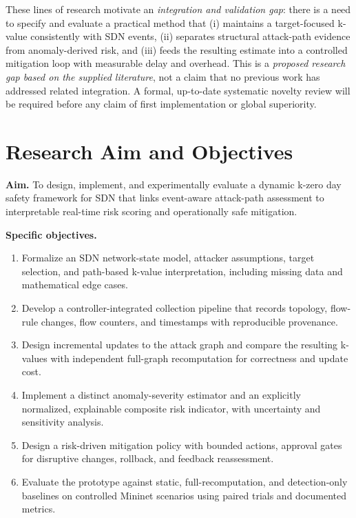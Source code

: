 \documentclass[12pt,a4paper,oneside]{article}
\begin{document}
These lines of research motivate an \emph{integration and validation gap}: there is a need to specify and evaluate a practical method that (i) maintains a target-focused k-value consistently with SDN events, (ii) separates structural attack-path evidence from anomaly-derived risk, and (iii) feeds the resulting estimate into a controlled mitigation loop with measurable delay and overhead. This is a \emph{proposed research gap based on the supplied literature}, not a claim that no previous work has addressed related integration. A formal, up-to-date systematic novelty review will be required before any claim of first implementation or global superiority.

\section{Research Aim and Objectives}\label{sec:objectives}
\textbf{Aim.} To design, implement, and experimentally evaluate a dynamic k-zero day safety framework for SDN that links event-aware attack-path assessment to interpretable real-time risk scoring and operationally safe mitigation.

\textbf{Specific objectives.}
\begin{enumerate}[label=\textbf{O\arabic*.}]
\item Formalize an SDN network-state model, attacker assumptions, target selection, and path-based k-value interpretation, including missing data and mathematical edge cases.
\item Develop a controller-integrated collection pipeline that records topology, flow-rule changes, flow counters, and timestamps with reproducible provenance.
\item Design incremental updates to the attack graph and compare the resulting k-values with independent full-graph recomputation for correctness and update cost.
\item Implement a distinct anomaly-severity estimator and an explicitly normalized, explainable composite risk indicator, with uncertainty and sensitivity analysis.
\item Design a risk-driven mitigation policy with bounded actions, approval gates for disruptive changes, rollback, and feedback reassessment.
\item Evaluate the prototype against static, full-recomputation, and detection-only baselines on controlled Mininet scenarios using paired trials and documented metrics.
\end{enumerate}
\end{document}
